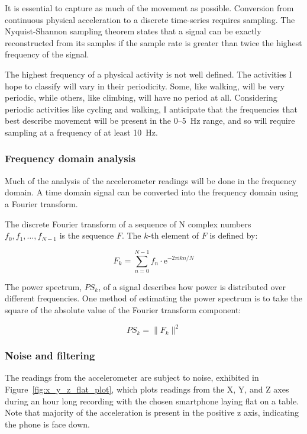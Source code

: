     It is essential to capture as much of the movement as possible. Conversion from continuous 
    physical acceleration to a discrete time-series requires sampling. The Nyquist-Shannon sampling theorem states that a signal can be exactly reconstructed from its samples if the sample rate is greater than twice the highest frequency of the signal.
    
    The highest frequency of a physical activity is not well defined. The activities I hope to classify will vary in their periodicity. Some, like walking, will be very periodic, while others, like climbing, will have no period at all. Considering periodic activities like cycling and walking, I anticipate that the frequencies that best describe movement will be present in the 0--5~\si{Hz} range, and so will require sampling at a frequency of at least 10~\si{Hz}.
    
    \subsubsection{Frequency domain analysis}
      Much of the analysis of the accelerometer readings will be done in the frequency domain. A time domain signal can be converted into the frequency domain using a Fourier transform.
      
      The discrete Fourier transform of a sequence of N complex numbers $f_0, f_1, \ldots, f_{N-1}$ is the sequence $F$. The $k$-th element of $F$ is defined by:
      
      $$F_k = \sum\limits_{n=0}^{N-1} f_n \cdot \mathrm{e}^{-2\pi \mathrm{i} kn/N}$$
      
      The power spectrum, $PS_k$, of a signal describes how power is distributed over different frequencies. One method of estimating the power spectrum is to take the square of the absolute value of the Fourier transform component:
      
      $$PS_k = \|F_k\|^2$$
      
    \subsubsection{Noise and filtering}
      The readings from the accelerometer are subject to noise, exhibited in 
      Figure~\ref{fig:x_y_z_flat_plot}, which plots readings from the X, Y, and Z axes during an hour long recording with the chosen smartphone laying flat on a table. Note that majority of the acceleration is present in the positive z axis, indicating the phone is face down.
      
